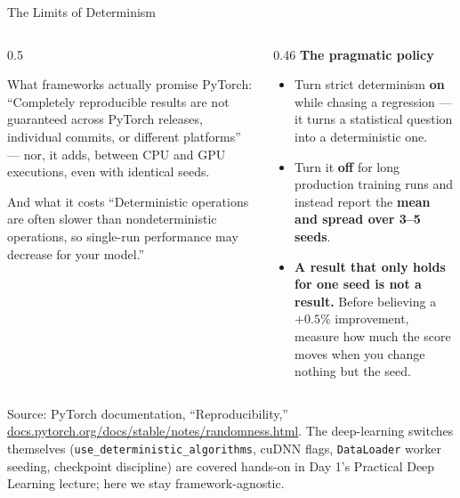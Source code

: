 
\begin{frame}{The Limits of Determinism}

    \begin{columns}[T]
        \begin{column}{0.5\textwidth}
            \begin{alertblock}{What frameworks actually promise}
                \small PyTorch: ``Completely reproducible results are not guaranteed across PyTorch
                releases, individual commits, or different platforms'' --- nor, it adds, between CPU and
                GPU executions, even with identical seeds.
            \end{alertblock}
            \vspace{0.4em}
            \begin{block}{And what it costs}
                \small ``Deterministic operations are often slower than nondeterministic operations, so
                single-run performance may decrease for your model.''
            \end{block}
        \end{column}
        \begin{column}{0.46\textwidth}
            \small
            \textbf{The pragmatic policy}
            \begin{itemize}
                \item Turn strict determinism \textbf{on} while chasing a regression --- it turns a
                      statistical question into a deterministic one.
                \item Turn it \textbf{off} for long production training runs and instead report the
                      \textbf{mean and spread over 3--5 seeds}.
                \item \textbf{A result that only holds for one seed is not a result.} Before believing a
                      $+0.5\%$ improvement, measure how much the score moves when you change nothing but
                      the seed.
            \end{itemize}
        \end{column}
    \end{columns}

    \vspace{0.6em}
    {\scriptsize Source: PyTorch documentation, ``Reproducibility,''
    \href{https://docs.pytorch.org/docs/stable/notes/randomness.html}{docs.pytorch.org/docs/stable/notes/randomness.html}.
    The deep-learning switches themselves (\texttt{use\_deterministic\_algorithms}, cuDNN flags,
    \texttt{DataLoader} worker seeding, checkpoint discipline) are covered hands-on in
    Day 1's Practical Deep Learning lecture; here we stay framework-agnostic.}

\end{frame}
